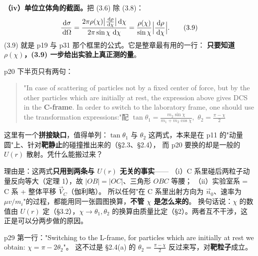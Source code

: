 \documentclass[11pt]{ctexart}
\providecommand{\th}{}\renewcommand{\th}{\theta}
\begin{document}
\textbf{（iv）单位立体角的截面。}把 (3.6) 除 (3.8)：
\[
\frac{\,\mathrm{d}\sigma}{\,\mathrm{d}\Omega}
=\frac{2\pi\rho(\chi)\bigl|\frac{\,\mathrm{d}\rho}{\,\mathrm{d}\chi}\bigr|\,\mathrm{d}\chi}{2\pi\sin\chi\,\,\mathrm{d}\chi}
=\frac{\rho(\chi)}{\sin\chi}\Bigl|\frac{\,\mathrm{d}\rho}{\,\mathrm{d}\chi}\Bigr| . \tag{3.9}
\]
(3.9) 就是 p19 与 p31 那个框里的公式。它是整章最有用的一行：
\textbf{只要知道 $\rho(\chi)$，(3.9) 一步给出实验上真正测的量}。




p20 下半页只有两句：

\begin{quote}
"In case of scattering of particles not by a fixed center of force, but by the other particles which are initially at rest, the expression above gives DCS in the \textbf{C-frame}. In order to switch to the laboratory frame, one should use the transformation expressions:"\quad 配 $\tan\th_1=\frac{m_2\sin\chi}{m_1+m_2\cos\chi}$,\ $\th_2=\frac{\pi-\chi}{2}$
\end{quote}

这里有一个\textbf{拼接缺口}，值得单列：$\tan\th_1$ 与 $\th_2$ 这两式，本来是在 p11 的"动量圆"上、针对\textbf{靶静止}的碰撞推出来的（§2.3、§2.4），
而 p20 要换的却是一般的 $U(r)$ 散射。凭什么能搬过来？

理由是：这两式\textbf{只用到两条与 $U(r)$ 无关的事实}——
（i）C 系里碰后两粒子动量反向等大（定理 1），故 $|OB|=|OC|$、三角形 $OBC$ 等腰；
（ii）实验室系 = C 系 + 整体平移 $\vec V_C$（伽利略）。
所以任何"在 C 系里出射方向为 $\vec n_0$、速率为 $\mu v/m_i$"的过程，都能用同一张圆图换算，\textbf{不管 $\chi$ 是怎么来的}。
换句话说：$\chi$ 的数值由 $U(r)$ 定（§3.2），$\chi\to\th_1,\th_2$ 的换算由质量比定（§2）。两者互不干涉，这正是可以分两步做的原因。

\subhdr{4.2　$\chi=\pi-2\th_2$ 与 $\dd\sigma_2$（p29 第一式）}

p29 第一行："Switching to the L-frame, for particles which are initially at rest we obtain: $\chi=\pi-2\th_2$"。
这不过是 §2.4(a) 的 $\th_2=\frac{\pi-\chi}{2}$ 反过来写，对\textbf{靶粒子}成立。
\end{document}
